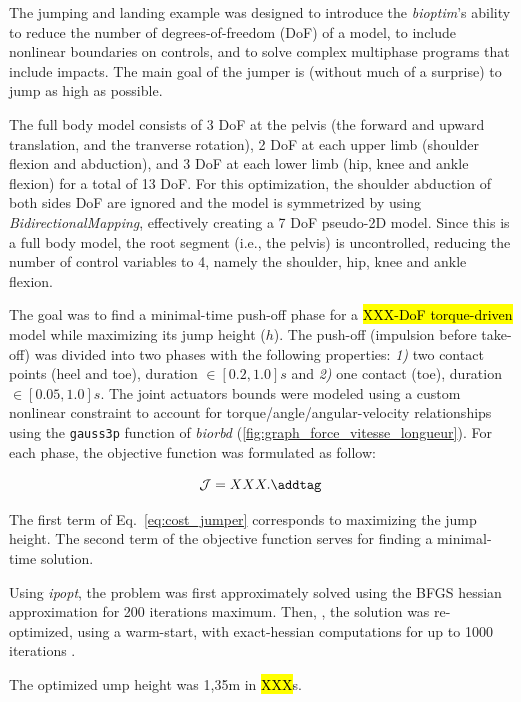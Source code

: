 The jumping and landing example was designed to introduce the \emph{bioptim}'s ability to reduce the number of degrees-of-freedom (DoF) of a model, to include nonlinear boundaries on controls, and to solve complex multiphase programs that include impacts.
The main goal of the jumper is (without much of a surprise) to jump as high as possible.

The full body model consists of 3 DoF at the pelvis (the forward and upward translation, and the tranverse rotation), 2 DoF at each upper limb (shoulder flexion and abduction), and 3 DoF at each lower limb (hip, knee and ankle flexion) for a total of 13 DoF.
For this optimization, the shoulder abduction of both sides DoF are ignored and the model is symmetrized by using \emph{BidirectionalMapping}, effectively creating a 7 DoF pseudo-2D model. 
Since this is a full body model, the root segment (i.e., the pelvis) is uncontrolled, reducing the number of control variables to 4, namely the shoulder, hip, knee and ankle flexion. 


The goal was to find a minimal-time push-off phase for a \hl{XXX-DoF torque-driven} model while maximizing its jump height ($h$).
The push-off (impulsion before take-off) was divided into two phases with the following properties: \emph{1)} two contact points (heel and toe), duration $\in [0.2, 1.0]s$ and \emph{2)} one contact (toe), duration $\in [0.05, 1.0]s$.
The joint actuators bounds were modeled using a custom nonlinear constraint to account for torque/angle/angular-velocity relationships using the \verb?gauss3p? function of \emph{biorbd}  (\ref{fig:graph_force_vitesse_longueur}).
For each phase, the objective function was formulated as follow:

\[
\mathcal{J} = XXX.
\addtag
\label{eq:cost_jumper}
\]

The first term of Eq.~\ref{eq:cost_jumper} corresponds to maximizing the jump height.
The second term of the objective function serves for finding a minimal-time solution.

Using \emph{ipopt}, the problem was first approximately solved using the BFGS hessian approximation for 200 iterations maximum.
Then, , the solution was re-optimized, using a warm-start, with exact-hessian computations for up to 1000 iterations .

The optimized ump height was 1,35m in \hl{XXX}s.

